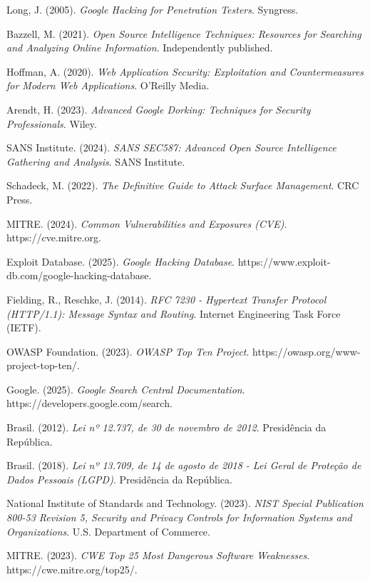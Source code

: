 \documentclass[12pt,a4paper]{book}
\begin{document}
\begin{thebibliography}{99}
     Long, J. (2005). \textit{Google Hacking for Penetration Testers}. Syngress.
    
     Bazzell, M. (2021). \textit{Open Source Intelligence Techniques: Resources for Searching and Analyzing Online Information}. Independently published.
    
     Hoffman, A. (2020). \textit{Web Application Security: Exploitation and Countermeasures for Modern Web Applications}. O'Reilly Media.
    
     Arendt, H. (2023). \textit{Advanced Google Dorking: Techniques for Security Professionals}. Wiley.
    
     SANS Institute. (2024). \textit{SANS SEC587: Advanced Open Source Intelligence Gathering and Analysis}. SANS Institute.
    
     Schadeck, M. (2022). \textit{The Definitive Guide to Attack Surface Management}. CRC Press.
    
     MITRE. (2024). \textit{Common Vulnerabilities and Exposures (CVE)}. https://cve.mitre.org.
    
     Exploit Database. (2025). \textit{Google Hacking Database}. https://www.exploit-db.com/google-hacking-database.
    
     Fielding, R., Reschke, J. (2014). \textit{RFC 7230 - Hypertext Transfer Protocol (HTTP/1.1): Message Syntax and Routing}. Internet Engineering Task Force (IETF).
    
     OWASP Foundation. (2023). \textit{OWASP Top Ten Project}. https://owasp.org/www-project-top-ten/.
    
     Google. (2025). \textit{Google Search Central Documentation}. https://developers.google.com/search.
    
     Brasil. (2012). \textit{Lei nº 12.737, de 30 de novembro de 2012}. Presidência da República.
    
     Brasil. (2018). \textit{Lei nº 13.709, de 14 de agosto de 2018 - Lei Geral de Proteção de Dados Pessoais (LGPD)}. Presidência da República.
    
     National Institute of Standards and Technology. (2023). \textit{NIST Special Publication 800-53 Revision 5, Security and Privacy Controls for Information Systems and Organizations}. U.S. Department of Commerce.
    
     MITRE. (2023). \textit{CWE Top 25 Most Dangerous Software Weaknesses}. https://cwe.mitre.org/top25/.
\end{thebibliography}
\end{document}
